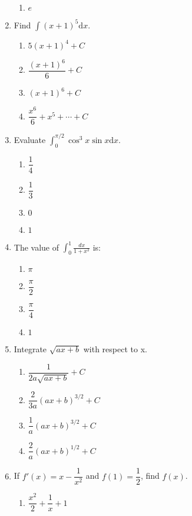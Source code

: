 \begin{multicols}{2}
\begin{enumerate}[label={\arabic*.}]
\begin{enumerate}[label={\Alph*.}]
        \item \(e\)
      \end{enumerate}
    \item Find \(\displaystyle \int (x+1)^5 \mathrm{d}x\).
      \begin{enumerate}[label={\Alph*.}]
        \item \(5(x+1)^4 + C\)
        \item \(\dfrac{(x+1)^6}{6} + C\)
        \item \((x+1)^6 + C\)
        \item \(\dfrac{x^6}{6} + x^5 + \cdots + C\)
      \end{enumerate}
    \item Evaluate \(\displaystyle \int_0^{\pi/2} \cos^3 x \sin x \mathrm{d}x\).
      \begin{enumerate}[label={\Alph*.}]
        \item \(\dfrac{1}{4}\)
        \item \(\dfrac{1}{3}\)
        \item \(0\)
        \item \(1\)
      \end{enumerate}
    \item The value of \(\displaystyle \int_0^1 \frac{dx}{1+x^2}\) is:
      \begin{enumerate}[label={\Alph*.}]
        \item \(\pi\)
        \item \(\dfrac{\pi}{2}\)
        \item \(\dfrac{\pi}{4}\)
        \item \(1\)
      \end{enumerate}
    \item Integrate \( \sqrt{ax+b} \) with respect to x.
      \begin{enumerate}[label={\Alph*.}]
        \item \( \dfrac{1}{2a\sqrt{ax+b}} + C \)
        \item \( \dfrac{2}{3a}(ax+b)^{3/2} + C \)
        \item \( \dfrac{1}{a}(ax+b)^{3/2} + C \)
        \item \( \dfrac{2}{a}(ax+b)^{1/2} + C \)
      \end{enumerate}
    \item If \(f'(x) = x - \dfrac{1}{x^2}\) and \(f(1) = \dfrac{1}{2}\), find \(f(x)\).
      \begin{enumerate}[label={\Alph*.}]
        \item \(\dfrac{x^2}{2} + \dfrac{1}{x} + 1\)

\end{enumerate}
\end{enumerate}
\end{multicols}
